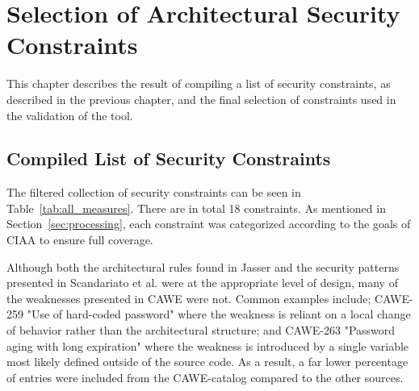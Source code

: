 \chapter{Selection of Architectural Security Constraints}

This chapter describes the result of compiling a list of security constraints, as described in the previous chapter, and the final selection of constraints used in the validation of the tool.  

\section{Compiled List of Security Constraints}

The filtered collection of security constraints can be seen in Table~\ref{tab:all_measures}. There are in total 18 constraints. As mentioned in Section~\ref{sec:processing}, each constraint was categorized according to the goals of CIAA to ensure full coverage. 

Although both the architectural rules found in Jasser \cite{franch_constraining_2019} and the security patterns presented in Scandariato et al. \cite{scandariato_system_2006} were at the appropriate level of design, many of the weaknesses presented in CAWE were not. Common examples include; CAWE-259 "Use of hard-coded password" where the weakness is reliant on a local change of behavior rather than the architectural structure; and CAWE-263 "Password aging with long expiration" where the weakness is introduced by a single variable most likely defined outside of the source code. As a result, a far lower percentage of entries were included from the CAWE-catalog compared to the other sources.




